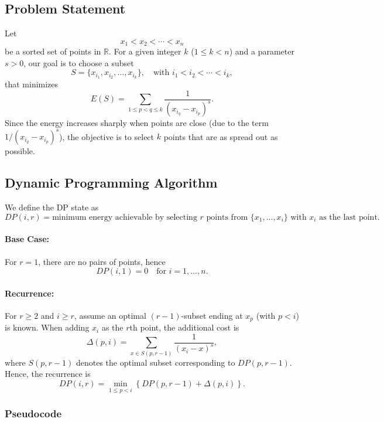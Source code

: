\documentclass[11pt]{article}
\begin{document}
\subsection{Problem Statement}

Let 
\[
x_1 < x_2 < \cdots < x_n
\]
be a sorted set of points in \(\mathbb{R}\). For a given integer \(k\) (\(1 \le k < n\)) and a parameter \(s>0\), our goal is to choose a subset 
\[
S = \{ x_{i_1}, x_{i_2}, \dots, x_{i_k} \}, \quad \text{with } i_1 < i_2 < \cdots < i_k,
\]
that minimizes
\[
E(S) = \sum_{1 \le p < q \le k} \frac{1}{\left(x_{i_q} - x_{i_p}\right)^s}.
\]
Since the energy increases sharply when points are close (due to the term \(1/(x_{i_q}-x_{i_p})^s\)), the objective is to select \(k\) points that are as spread out as possible.

\subsection{Dynamic Programming Algorithm}

We define the DP state as
\[
DP(i,r)=\text{minimum energy achievable by selecting \(r\) points from } \{x_1, \dots, x_i\} \text{ with } x_i \text{ as the last point.}
\]

\paragraph{Base Case:} For \(r=1\), there are no pairs of points, hence 
\[
DP(i,1)=0 \quad \text{for } i=1,\dots,n.
\]

\paragraph{Recurrence:} For \(r\ge2\) and \(i\ge r\), assume an optimal \((r-1)\)-subset ending at \(x_p\) (with \(p < i\)) is known. When adding \(x_i\) as the \(r\)th point, the additional cost is
\[
\Delta(p,i)=\sum_{x \in S(p,r-1)} \frac{1}{(x_i - x)^s},
\]
where \(S(p,r-1)\) denotes the optimal subset corresponding to \(DP(p, r-1)\). Hence, the recurrence is
\[
DP(i,r)=\min_{1 \le p < i} \left\{ DP(p,r-1) + \Delta(p,i) \right\}.
\]

\subsubsection*{Pseudocode}
\end{document}
